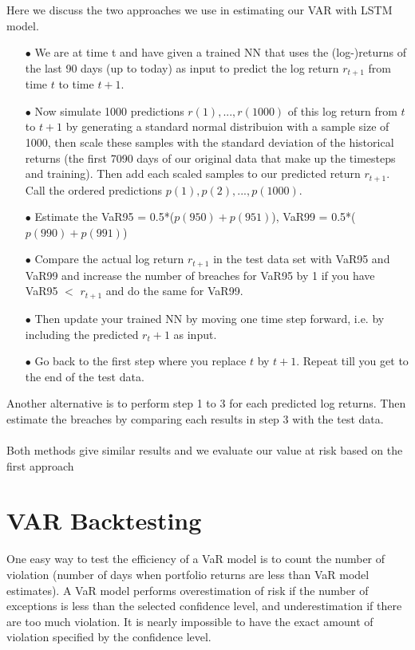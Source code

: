 \documentclass[a4paper,11pt,oneside]{book}
\begin{document}
Here we discuss the two approaches we use in estimating our VAR with LSTM model. 
\begin{itemize}
	
\item[$\bullet$]   We are at time t and have given a trained NN that uses the (log-)returns of the last 90 days (up to
today) as input to predict the log return $r_{t+1}$ from time $t$ to time $t+1$.
\item[$\bullet$]      Now simulate 1000 predictions $r(1), ..., r(1000)$ of this log return from $t$ to $t+1$ by generating a standard normal distribuion with a sample size of 1000, then scale these samples with the standard deviation of the historical returns (the first 7090 days of our original data that make up the timesteps and training). Then add each scaled samples to  our predicted return $r_{t+1}$. Call the ordered
predictions $p(1),p(2),...,p(1000)$.

\item[$\bullet$] Estimate the VaR95 = 0.5*($p(950)+p(951)$), VaR99 = 0.5*($p(990)+p(991)$)


\item[$\bullet$] Compare the actual log return $r_{t+1}$ in the test data set with VaR95 and VaR99 and increase the number
of breaches for VaR95 by 1 if you have VaR95 $<$ $r_{t+1}$ and do the same for VaR99.

\item[$\bullet$] Then update your trained NN by moving one time step forward, i.e. by including the predicted $r_t+1$ as input.
\item[$\bullet$] Go back to the first step where you replace $t$ by $t+1$. Repeat till you get to the end of the test data.

\end{itemize}

Another alternative is to perform step 1 to 3 for each predicted log returns. Then estimate the breaches by comparing each results in step 3 with the test data.\\\\

Both methods give similar results  and we evaluate our value at risk based on the first approach

\section{VAR Backtesting}
One easy way to test the efficiency of a VaR model is to count the number of violation (number of days when portfolio returns are less than VaR model estimates). A VaR model performs overestimation of risk if the number of exceptions is less than the selected confidence level, and underestimation if there are too much violation. It is nearly impossible to have the exact amount of violation specified by the confidence level.\newline\newline
\end{document}
